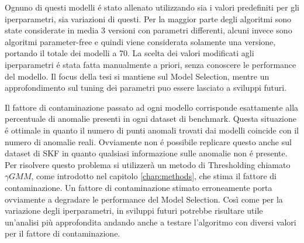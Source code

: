Ognuno di questi modelli é stato allenato utilizzando sia i valori predefiniti per gli iperparametri, sia variazioni di questi. 
Per la maggior parte degli algoritmi sono state considerate in media 3 versioni con parametri differenti, alcuni invece sono algoritmi parameter-free e quindi viene considerata solamente una versione, portando il totale dei modelli a 70.
La scelta dei valori modificati agli iperparametri é stata fatta manualmente a priori, senza conoscere le performance del modello. Il focus della tesi si mantiene sul Model Selection, mentre un approfondimento sul tuning dei parametri puo essere lasciato a sviluppi futuri.

Il fattore di contaminazione passato ad ogni modello corrisponde esattamente alla percentuale di anomalie presenti in ogni dataset di benchmark. Questa situazione é ottimale in quanto il numero di punti anomali trovati dai modelli coincide con il numero di anomalie reali. Ovviamente non é possibile replicare questo anche sul dataset di SKF in quanto qualsiasi informazione sulle anomalie non é presente. Per risolvere questo problema si utilizzerà un metodo di Thresholding chiamato ${\gamma}GMM$, come introdotto nel capitolo \ref{chap:methods}, che stima il fattore di contaminazione. Un fattore di contaminazione stimato erroneamente porta ovviamente a degradare le performance del Model Selection. Così come per la variazione degli iperparametri, in sviluppi futuri potrebbe risultare utile un'analisi più approfondita andando anche a testare l'algoritmo con diversi valori per il fattore di contaminazione.



